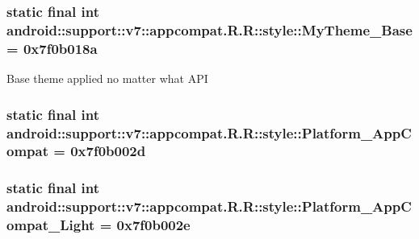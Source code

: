 \hypertarget{classandroid_1_1support_1_1v7_1_1appcompat_1_1_r_1_1style_4d006cd4edc1493b17b1f94818a46bdb}{
\subsubsection[{MyTheme\_\-Base}]{\setlength{\rightskip}{0pt plus 5cm}static final int android::support::v7::appcompat.R.R::style::MyTheme\_\-Base = 0x7f0b018a}}
\label{classandroid_1_1support_1_1v7_1_1appcompat_1_1_r_1_1style_4d006cd4edc1493b17b1f94818a46bdb}


Base theme applied no matter what API \hypertarget{classandroid_1_1support_1_1v7_1_1appcompat_1_1_r_1_1style_b58a05db80ea105b5554605910a13d76}{
\subsubsection[{Platform\_\-AppCompat}]{\setlength{\rightskip}{0pt plus 5cm}static final int android::support::v7::appcompat.R.R::style::Platform\_\-AppCompat = 0x7f0b002d}}
\label{classandroid_1_1support_1_1v7_1_1appcompat_1_1_r_1_1style_b58a05db80ea105b5554605910a13d76}


\hypertarget{classandroid_1_1support_1_1v7_1_1appcompat_1_1_r_1_1style_477080231454c68e6fd2d64e34a643c2}{
\subsubsection[{Platform\_\-AppCompat\_\-Light}]{\setlength{\rightskip}{0pt plus 5cm}static final int android::support::v7::appcompat.R.R::style::Platform\_\-AppCompat\_\-Light = 0x7f0b002e}}
\label{classandroid_1_1support_1_1v7_1_1appcompat_1_1_r_1_1style_477080231454c68e6fd2d64e34a643c2}


